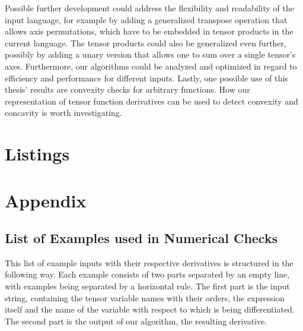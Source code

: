 \documentclass[12pt, a4paper]{report} %
\begin{document}
Possible further development could address the flexibility and readability of the input language, for example by adding a generalized transpose operation that allows axis permutations, which have to be embedded in tensor products in the current language.
The tensor products could also be generalized even further, possibly by adding a unary version that allows one to sum over a single tensor's axes.
Furthermore, our algorithms could be analyzed and optimized in regard to efficiency and performance for different inputs.
Lastly, one possible use of this thesis' results are convexity checks for arbitrary functions.
How our representation of tensor function derivatives can be used to detect convexity and concavity is worth investigating.

\printbibliography
{}

\clearpage
\chapter*{Listings}\vspace{-50pt}
\listoffigures
\listoftables
\listofalgorithms

\chapter*{Appendix}
\section*{List of Examples used in Numerical Checks}
This list of example inputs with their respective derivatives is structured in the following way.
Each example consists of two parts separated by an empty line, with examples being separated by a horizontal rule.
The first part is the input string, containing the tensor variable names with their orders, the expression itself and the name of the variable with respect to which is being differentiated.
The second part is the output of our algorithm, the resulting derivative.
\end{document}
